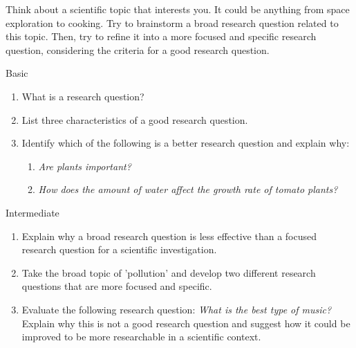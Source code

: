 \begin{stopandthink}
Think about a scientific topic that interests you.  It could be anything from space exploration to cooking.  Try to brainstorm a broad research question related to this topic. Then, try to refine it into a more focused and specific research question, considering the criteria for a good research question.
\end{stopandthink}

\begin{tieredquestions}{Basic}
\begin{enumerate}
    \item What is a research question?
    \item List three characteristics of a good research question.
    \item Identify which of the following is a better research question and explain why:
    \begin{enumerate}
        \item \textit{Are plants important?}
        \item \textit{How does the amount of water affect the growth rate of tomato plants?}
    \end{enumerate}
\end{enumerate}
\end{tieredquestions}

\begin{tieredquestions}{Intermediate}
\begin{enumerate}
    \item Explain why a broad research question is less effective than a focused research question for a scientific investigation.
    \item  Take the broad topic of 'pollution' and develop two different research questions that are more focused and specific.
    \item  Evaluate the following research question: \textit{What is the best type of music?}  Explain why this is not a good research question and suggest how it could be improved to be more researchable in a scientific context.
\end{enumerate}
\end{tieredquestions}

